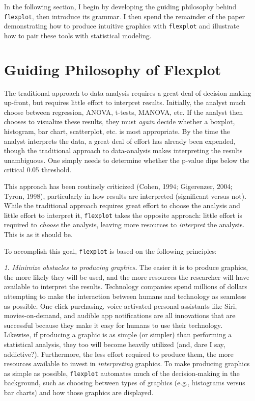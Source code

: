 \documentclass[
  doc]{apa6}
\begin{document}
In the following section, I begin by developing the guiding philosophy behind \texttt{flexplot}, then introduce its grammar. I then spend the remainder of the paper demonstrating how to produce intuitive graphics with \texttt{flexplot} and illustrate how to pair these tools with statistical modeling.

\hypertarget{guiding-philosophy-of-flexplot}{%
\section{Guiding Philosophy of Flexplot}\label{guiding-philosophy-of-flexplot}}

The traditional approach to data analysis requires a great deal of decision-making up-front, but requires little effort to interpret results. Initially, the analyst much choose between regression, ANOVA, t-tests, MANOVA, etc. If the analyst then chooses to visualize these results, they must \emph{again} decide whether a boxplot, histogram, bar chart, scatterplot, etc. is most appropriate. By the time the analyst interprets the data, a great deal of effort has already been expended, though the traditional approach to data-analysis makes interpreting the results unambiguous. One simply needs to determine whether the p-value dips below the critical 0.05 threshold.

This approach has been routinely criticized (Cohen, 1994; Gigerenzer, 2004; Tyron, 1998), particularly in how results are interpreted (significant versus not). While the traditional approach requires great effort to choose the analysis and little effort to interpret it, \texttt{flexplot} takes the opposite approach: little effort is required to \emph{choose} the analysis, leaving more resources to \emph{interpret} the analysis. This is as it should be.

To accomplish this goal, \texttt{flexplot} is based on the following principles:

\emph{1. Minimize obstacles to producing graphics.} The easier it is to produce graphics, the more likely they will be used, and the more resources the researcher will have available to interpret the results. Technology companies spend millions of dollars attempting to make the interaction between humans and technology as seamless as possible. One-click purchasing, voice-activated personal assistants like Siri, movies-on-demand, and audible app notifications are all innovations that are successful because they make it easy for humans to use their technology. Likewise, if producing a graphic is as simple (or simpler) than performing a statistical analysis, they too will become heavily utilized (and, dare I say, addictive?). Furthermore, the less effort required to produce them, the more resources available to invest in \emph{interpreting} graphics. To make producing graphics as simple as possible, \texttt{flexplot} automates much of the decision-making in the background, such as choosing between types of graphics (e.g., histograms versus bar charts) and how those graphics are displayed.
\end{document}
